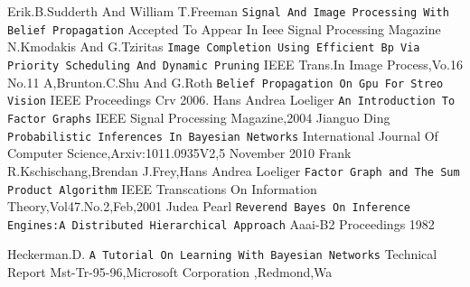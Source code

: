 \documentclass{raitdisser}
\begin{document}
\begin{thebibliography}{9}
Erik.B.Sudderth And William T.Freeman
\texttt{Signal And Image Processing With Belief Propagation}
Accepted To Appear In Ieee Signal Processing Magazine
\\
N.Kmodakis And G.Tziritas
\texttt{Image Completion Using Efficient Bp Via Priority Scheduling And Dynamic Pruning}
IEEE Trans.In Image Process,Vo.16 No.11
A,Brunton.C.Shu And G.Roth
\texttt{Belief Propagation On Gpu For Streo Vision}
IEEE Proceedings Crv 2006.
Hans Andrea Loeliger
\texttt{An Introduction To Factor Graphs}
IEEE Signal Processing Magazine,2004
Jianguo Ding
\texttt{Probabilistic Inferences In Bayesian Networks}
International Journal Of Computer Science,Arxiv:1011.0935V2,5 November 2010
Frank R.Kschischang,Brendan J.Frey,Hans Andrea Loeliger
\texttt{Factor Graph and The Sum Product Algorithm}
IEEE Transcations On Information Theory,Vol47.No.2,Feb,2001
Judea Pearl
\texttt{Reverend Bayes On Inference Engines:A Distributed Hierarchical Approach}
Aaai-B2 Proceedings 1982

Heckerman.D.
\texttt{A Tutorial On Learning With Bayesian Networks}
Technical Report Mst-Tr-95-96,Microsoft Corporation ,Redmond,Wa





\end{thebibliography}

%
\end{document}
